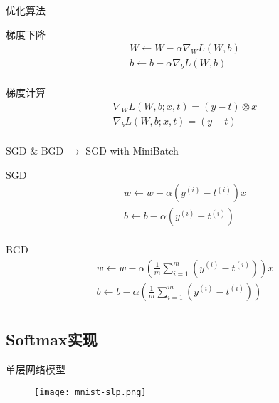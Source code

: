 \begin{frame}[fragile]{优化算法}
\begin{block}{梯度下降}
\[\begin{gathered}
  W \leftarrow W - \alpha {\nabla _W}L\left( {W,b} \right) \\ 
  b \leftarrow b - \alpha {\nabla _b}L\left( {W,b} \right) \\ 
\end{gathered} \]
\end{block}

\begin{block}{梯度计算}  
\[\begin{gathered} 
  {\nabla _W}L\left( {W,b;x,t} \right) = \left( {y - t} \right)\otimes
x \\ 
  {\nabla _b}L\left( {W,b;x,t} \right) = \left( {y - t} \right) \\   
\end{gathered} \]
\end{block}
\end{frame}

\begin{frame}[fragile]{SGD $\&$ BGD $\rightarrow$ SGD with MiniBatch}
\begin{block}{SGD}
\[\begin{aligned}
  w \leftarrow w - \alpha \left( {{y^{(i)}} - {t^{(i)}}} \right)x \\ 
  b \leftarrow b - \alpha \left( {{y^{(i)}} - {t^{(i)}}} \right) \\ 
\end{aligned} \]
\end{block}

\begin{block}{BGD}
\[\begin{gathered}
  w \leftarrow w - \alpha \left( {\frac{1}{m}\sum\limits_{i = 1}^m {\left( {{y^{(i)}} - {t^{(i)}}} \right)} } \right)x \\ 
  b \leftarrow b - \alpha \left( {\frac{1}{m}\sum\limits_{i = 1}^m {\left( {{y^{(i)}} - {t^{(i)}}} \right)} } \right) \\ 
\end{gathered} \]
\end{block}
\end{frame}

\subsection{Softmax实现}

\begin{frame}{单层网络模型}
  \begin{figure}
    \centering
    \texttt{[image: mnist-slp.png]}
  \end{figure}
\end{frame}

